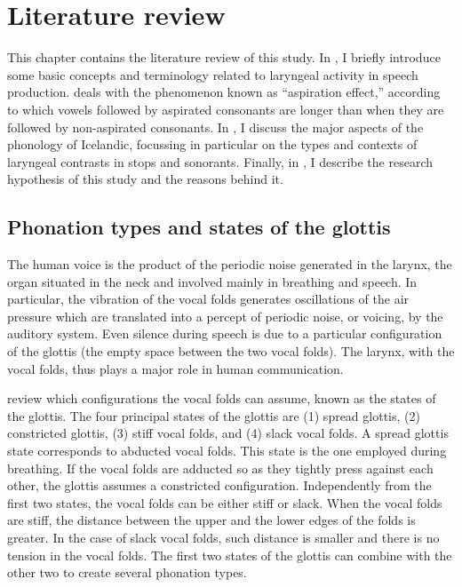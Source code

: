 \documentclass[11pt,a4paper,oneside,openany]{memoir}\usepackage[]{graphicx}\usepackage[]{color}
\begin{document}
\chapter{Literature review}
\label{c:review}
This chapter contains the literature review of this study.
In , I briefly introduce some basic concepts and terminology related to laryngeal activity in speech production.
 deals with the phenomenon known as ``aspiration effect,'' according to which vowels followed by aspirated consonants are longer than when they are followed by non-aspirated consonants.
In , I discuss the major aspects of the phonology of Icelandic, focussing in particular on the types and contexts of laryngeal contrasts in stops and sonorants.
Finally, in , I describe the research hypothesis of this study and the reasons behind it.

\section{Phonation types and states of the glottis}
\label{s:phonation}
The human voice is the product of the periodic noise generated in the larynx, the organ situated in the neck and involved mainly in breathing and speech.
In particular, the vibration of the vocal folds generates oscillations of the air pressure which are translated into a percept of periodic noise, or voicing, by the auditory system.
Even silence during speech is due to a particular configuration of the glottis (the empty space between the two vocal folds).
The larynx, with the vocal folds, thus plays a major role in human communication.

\citet{halle2002} review which configurations the vocal folds can assume, known as the states of the glottis.
The four principal states of the glottis are (1) spread glottis, (2) constricted glottis, (3) stiff vocal folds, and (4) slack vocal folds.
A spread glottis state corresponds to abducted vocal folds.
This state is the one employed during breathing.
If the vocal folds are adducted so as they tightly press against each other, the glottis assumes a constricted configuration.
Independently from the first two states, the vocal folds can be either stiff or slack.
When the vocal folds are stiff, the distance between the upper and the lower edges of the folds is greater.
In the case of slack vocal folds, such distance is smaller and there is no tension in the vocal folds.
The first two states of the glottis can combine with the other two to create several phonation types.
\end{document}
